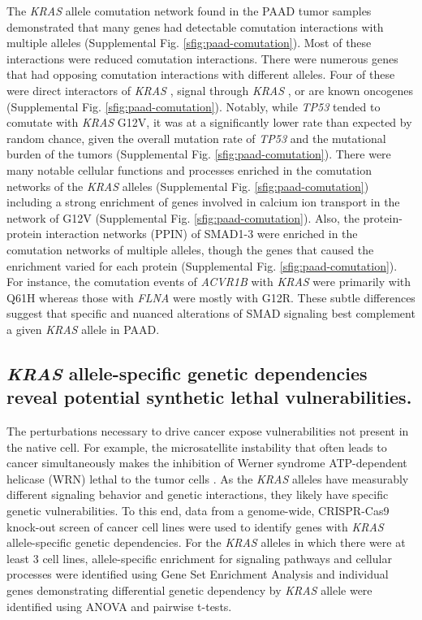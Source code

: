 \documentclass[english, 10pt, letterpaper]{article}
\newcommand{\KRAS}{\emph{KRAS}}
\begin{document}
The \KRAS{} allele comutation network found in the PAAD tumor samples demonstrated that many genes had detectable comutation interactions with multiple alleles (Supplemental Fig. \ref{sfig:paad-comutation}).
Most of these interactions were reduced comutation interactions.
There were numerous genes that had opposing comutation interactions with different alleles.
Four of these were direct interactors of \KRAS{} \cite{Kovalski2019}, signal through \KRAS{} \cite{Kanehisa2017, Kanehisa2016KEGGAnnotation.}, or are known oncogenes \cite{Bamford2004TheWebsite., Sondka2018} (Supplemental Fig. \ref{sfig:paad-comutation}).
Notably, while \emph{TP53} tended to comutate with \KRAS{} G12V, it was at a significantly lower rate than expected by random chance, given the overall mutation rate of \emph{TP53} and the mutational burden of the tumors (Supplemental Fig. \ref{sfig:paad-comutation}).
There were many notable cellular functions and processes enriched in the comutation networks of the \KRAS{} alleles (Supplemental Fig. \ref{sfig:paad-comutation}) including a strong enrichment of genes involved in calcium ion transport in the network of G12V (Supplemental Fig. \ref{sfig:paad-comutation}).
Also, the protein-protein interaction networks (PPIN) of SMAD1-3 were enriched in the comutation networks of multiple alleles, though the genes that caused the enrichment varied for each protein (Supplemental Fig. \ref{sfig:paad-comutation}).
For instance, the comutation events of \emph{ACVR1B} with \KRAS{} were primarily with Q61H whereas those with \emph{FLNA} were mostly with G12R.
These subtle differences suggest that specific and nuanced alterations of SMAD signaling best complement a given \KRAS{} allele in PAAD.


\subsection*{\KRAS{} allele-specific genetic dependencies reveal potential synthetic lethal vulnerabilities.}

The perturbations necessary to drive cancer expose vulnerabilities not present in the native cell.
For example, the microsatellite instability that often leads to cancer simultaneously makes the inhibition of Werner syndrome ATP-dependent helicase (WRN) lethal to the tumor cells \cite{Behan2019, Chan2019}.
As the \KRAS{} alleles have measurably different signaling behavior and genetic interactions, they likely have specific genetic vulnerabilities.
To this end, data from a genome-wide, CRISPR-Cas9 knock-out screen of cancer cell lines \cite{Tsherniak2017, Meyers2017} were used to identify genes with \KRAS{} allele-specific genetic dependencies.
For the \KRAS{} alleles in which there were at least 3 cell lines, allele-specific enrichment for signaling pathways and cellular processes were identified using Gene Set Enrichment Analysis and individual genes demonstrating differential genetic dependency by \KRAS{} allele were identified using ANOVA and pairwise t-tests.
\end{document}

